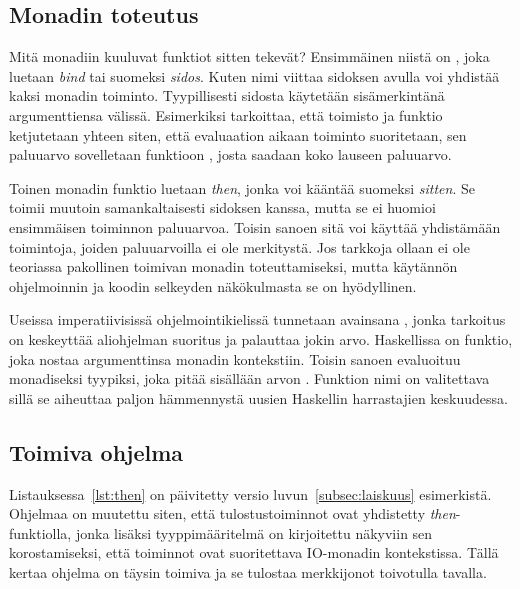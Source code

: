 \documentclass[finnish]{tktltiki2}
\begin{document}

\subsection{Monadin toteutus}

Mitä monadiin kuuluvat funktiot sitten tekevät? Ensimmäinen niistä on \code{>>=}, joka luetaan
\emph{bind} tai suomeksi \emph{sidos}. Kuten nimi viittaa sidoksen avulla voi yhdistää kaksi monadin
toiminto. Tyypillisesti sidosta käytetään sisämerkintänä argumenttiensa välissä. Esimerkiksi  tarkoittaa, että toimisto  ja funktio  ketjutetaan yhteen siten, että
evaluaation aikaan toiminto  suoritetaan, sen paluuarvo sovelletaan funktioon ,
josta saadaan koko lauseen paluuarvo.

Toinen monadin funktio \code{>>} luetaan \emph{then}, jonka voi kääntää suomeksi \emph{sitten}. Se
toimii muutoin samankaltaisesti sidoksen kanssa, mutta se ei huomioi ensimmäisen toiminnon
paluuarvoa. Toisin sanoen sitä voi käyttää yhdistämään toimintoja, joiden paluuarvoilla ei ole
merkitystä. Jos tarkkoja ollaan \code{>>} ei ole teoriassa pakollinen toimivan monadin
toteuttamiseksi, mutta käytännön ohjelmoinnin ja koodin selkeyden näkökulmasta se on hyödyllinen.


Useissa imperatiivisissä ohjelmointikielissä tunnetaan avainsana , jonka tarkoitus on
keskeyttää aliohjelman suoritus ja palauttaa jokin arvo. Haskellissa  on funktio, joka
nostaa argumenttinsa monadin kontekstiin. Toisin sanoen  evaluoituu monadiseksi
tyypiksi, joka pitää sisällään arvon . Funktion  nimi on valitettava sillä se
aiheuttaa paljon hämmennystä uusien Haskellin harrastajien keskuudessa.

\subsection{Toimiva ohjelma}

Listauksessa~\ref{lst:then} on päivitetty versio luvun~\ref{subsec:laiskuus} esimerkistä. Ohjelmaa
on muutettu siten, että tulostustoiminnot ovat yhdistetty \emph{then}-funktiolla, jonka lisäksi
tyyppimääritelmä on kirjoitettu näkyviin sen korostamiseksi, että toiminnot ovat suoritettava
IO-monadin kontekstissa. Tällä kertaa ohjelma on täysin toimiva ja se tulostaa merkkijonot
toivotulla tavalla.
\end{document}
